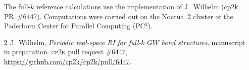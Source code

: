 \documentclass[%
 reprint,
superscriptaddress,
 amsmath,amssymb,
 aps,
prb,
]{revtex4-2}
\newcommand{\cpk}{\textsc{cp2k}}
\begin{document}
\begin{acknowledgments}
The full-$k$ reference calculations use the implementation of J.~Wilhelm (cp2k PR~\#6447).
Computations were carried out on the Noctua~2 cluster of the Paderborn Center for Parallel
Computing (PC$^2$).
\end{acknowledgments}

\begin{thebibliography}{2}
J.~Wilhelm, \emph{Periodic real-space RI for full-$k$ $GW$ band structures}, manuscript in
preparation.
\cpk{} pull request \#6447, \url{https://github.com/cp2k/cp2k/pull/6447}.
\end{thebibliography}
\end{document}
